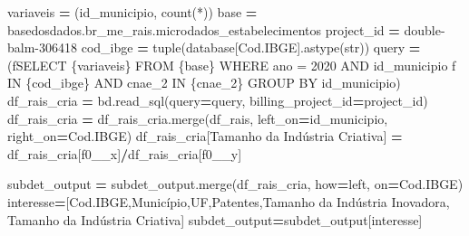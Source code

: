 \documentclass[
  12,
  dvipsnames]{article}
\newenvironment{Shaded}{\begin{snugshade}}{\end{snugshade}}
\newcommand{\BuiltInTok}[1]{#1}
\newcommand{\NormalTok}[1]{#1}
\newcommand{\OperatorTok}[1]{\textcolor[rgb]{0.81,0.36,0.00}{\textbf{#1}}}
\newcommand{\SpecialCharTok}[1]{\textcolor[rgb]{0.00,0.00,0.00}{#1}}
\newcommand{\SpecialStringTok}[1]{\textcolor[rgb]{0.31,0.60,0.02}{#1}}
\newcommand{\StringTok}[1]{\textcolor[rgb]{0.31,0.60,0.02}{#1}}
\begin{document}
\begin{Shaded}
\begin{Highlighting}[]
\NormalTok{variaveis }\OperatorTok{=}\NormalTok{ (}\StringTok{\textquotesingle{}id\_municipio, count(*)\textquotesingle{}}\NormalTok{)}
\NormalTok{base }\OperatorTok{=} \StringTok{\textquotesingle{}\textasciigrave{}basedosdados.br\_me\_rais.microdados\_estabelecimentos\textasciigrave{}\textquotesingle{}}
\NormalTok{project\_id }\OperatorTok{=} \StringTok{\textquotesingle{}double{-}balm{-}306418\textquotesingle{}}
\NormalTok{cod\_ibge }\OperatorTok{=} \BuiltInTok{tuple}\NormalTok{(database[}\StringTok{\textquotesingle{}Cod.IBGE\textquotesingle{}}\NormalTok{].astype(}\BuiltInTok{str}\NormalTok{))}
\NormalTok{query }\OperatorTok{=}\NormalTok{ (}\SpecialStringTok{f\textquotesingle{}SELECT }\SpecialCharTok{\{}\NormalTok{variaveis}\SpecialCharTok{\}}\SpecialStringTok{ FROM }\SpecialCharTok{\{}\NormalTok{base}\SpecialCharTok{\}}\SpecialStringTok{ WHERE ano = 2020 AND id\_municipio\textquotesingle{}} 
         \SpecialStringTok{f\textquotesingle{} IN }\SpecialCharTok{\{}\NormalTok{cod\_ibge}\SpecialCharTok{\}}\SpecialStringTok{ AND cnae\_2 IN }\SpecialCharTok{\{}\NormalTok{cnae\_2}\SpecialCharTok{\}}\SpecialStringTok{ GROUP BY id\_municipio\textquotesingle{}}\NormalTok{)}
\NormalTok{df\_rais\_cria }\OperatorTok{=}\NormalTok{ bd.read\_sql(query}\OperatorTok{=}\NormalTok{query, billing\_project\_id}\OperatorTok{=}\NormalTok{project\_id)}
\NormalTok{df\_rais\_cria }\OperatorTok{=}\NormalTok{ df\_rais\_cria.merge(df\_rais, left\_on}\OperatorTok{=}\StringTok{\textquotesingle{}id\_municipio\textquotesingle{}}\NormalTok{, right\_on}\OperatorTok{=}\StringTok{\textquotesingle{}Cod.IBGE\textquotesingle{}}\NormalTok{)}
\NormalTok{df\_rais\_cria[}\StringTok{\textquotesingle{}Tamanho da Indústria Criativa\textquotesingle{}}\NormalTok{] }\OperatorTok{=}\NormalTok{ df\_rais\_cria[}\StringTok{\textquotesingle{}f0\_\_x\textquotesingle{}}\NormalTok{]}\OperatorTok{/}\NormalTok{df\_rais\_cria[}\StringTok{\textquotesingle{}f0\_\_y\textquotesingle{}}\NormalTok{]}

\NormalTok{subdet\_output }\OperatorTok{=}\NormalTok{ subdet\_output.merge(df\_rais\_cria, how}\OperatorTok{=}\StringTok{\textquotesingle{}left\textquotesingle{}}\NormalTok{, on}\OperatorTok{=}\StringTok{\textquotesingle{}Cod.IBGE\textquotesingle{}}\NormalTok{)}
\NormalTok{interesse}\OperatorTok{=}\NormalTok{[}\StringTok{\textquotesingle{}Cod.IBGE\textquotesingle{}}\NormalTok{,}\StringTok{\textquotesingle{}Município\textquotesingle{}}\NormalTok{,}\StringTok{\textquotesingle{}UF\textquotesingle{}}\NormalTok{,}\StringTok{\textquotesingle{}Patentes\textquotesingle{}}\NormalTok{,}\StringTok{\textquotesingle{}Tamanho da Indústria Inovadora\textquotesingle{}}\NormalTok{,}
           \StringTok{\textquotesingle{}Tamanho da Indústria Criativa\textquotesingle{}}\NormalTok{]}
\NormalTok{subdet\_output}\OperatorTok{=}\NormalTok{subdet\_output[interesse]}


\end{Highlighting}
\end{Shaded}
\end{document}
